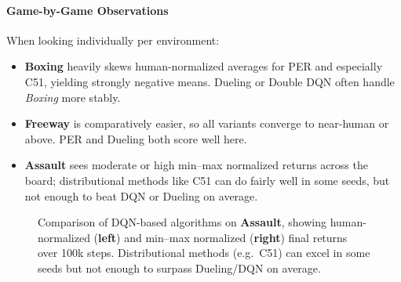 \paragraph{Game-by-Game Observations}
When looking individually per environment:
\begin{itemize}
	\item \textbf{Boxing} heavily skews human-normalized averages for PER and especially C51, 
	yielding strongly negative means. 
	Dueling or Double DQN often handle \emph{Boxing} more stably.
	\item \textbf{Freeway} is comparatively easier, so all variants converge to near-human or above. 
	PER and Dueling both score well here. 
	\item \textbf{Assault} sees moderate or high min--max normalized returns across the board; 
	distributional methods like C51 can do fairly well in some seeds, but not enough to beat DQN or Dueling on average.
\end{itemize}
\begin{figure}[htbp]
	\centering
	\quad
	\caption{Comparison of DQN-based algorithms on \textbf{Assault}, 
		showing human-normalized (\textbf{left}) and min--max normalized (\textbf{right}) 
		final returns over 100k steps. 
		Distributional methods (e.g.\ C51) can excel in some seeds but not enough to surpass Dueling/DQN on average.}
	\label{fig:assault_comparison}
\end{figure}

